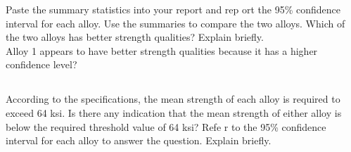 \documentclass[letterpaper]{article}
\begin{document}

Paste the summary statistics into your report and rep ort the 95\% confidence
interval for each alloy. Use the summaries to compare the two alloys. Which of
the two alloys has better strength qualities? Explain briefly.\\

Alloy 1 appears to have better strength qualities because it has a higher confidence level?

\subsection{}%
According to the specifications, the mean strength of each alloy is required to
exceed 64 ksi. Is there any indication that the mean strength of either alloy is
below the required threshold value of 64 ksi? Refe r to the 95\% confidence
interval for each alloy to answer the question. Explain briefly.
\end{document}
